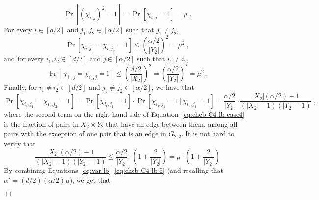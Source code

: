 \documentclass{article}
\newcommand{\Ex}{\mathbb{E}}
\newenvironment{proofof}[1]{\smallskip\noindent{\bf Proof of #1:}}%
        {\hspace*{\fill}$\Box$\par}
\newcommand{\commentt}[1]{ {}}
\begin{document}
\begin{proofof}{Claim~\ref{clm:Pr-Es}}
\begin{equation} \label{eq:cheb-C4-lb-case1}
\Pr[(\chi_{i,j})^2 = 1] = \Pr[\chi_{i,j}=1] = \mu\;.
\end{equation}
 For every $i\in [d/2]$ and $j_1,j_2 \in [\alpha/2]$ such that $j_1 \neq j_2$,
\begin{equation}\label{eq:cheb-C4-lb-case2}
\Pr[\chi_{i,j_1}=\chi_{i,j_2}=1]
  \leq \left( \frac{\alpha/2}{|Y_2|}\right)^2 = \mu^2
  \;,
\end{equation}
and for every $i_1,i_2\in [d/2]$ and $j\in [\alpha/2]$ such that $i_1\neq i_2$,
\begin{equation}\label{eq:cheb-C4-lb-case3}
 \Pr[\chi_{i_1,j}=\chi_{i_2,j}=1]
\leq %
\left( \frac{d/2}{|X_2|}\right)^2 = \left( \frac{\alpha/2}{|Y_2|}\right)^2 = \mu^2 %
\;.
\end{equation}
Finally,
for $i_1\neq i_2\in [d/2]$ and $j_1\neq j_2\in [\alpha/2]$, we have that
\begin{equation}\label{eq:cheb-C4-lb-case4}
\Pr[\chi_{i_1,j_1}=\chi_{i_2,j_2}=1]
=  \Pr[\chi_{i_1,j_1}=1] \cdot
\Pr[\chi_{i_1,j_1}=1\,|\,\chi_{i_2,j_1}=1]
  =\frac{\alpha/2}{|Y_2|}\cdot \frac{|X_2|(\alpha/2)-1}{(|X_2|-1)(|Y_2|-1)}\;,
\end{equation}
where the second term on the right-hand-side of Equation~\eqref{eq:cheb-C4-lb-case4} is the fraction of pairs in $X_2\times Y_2$ that have an edge between them, among all pairs with the exception of one pair that is an edge in $G_{2,2}$.
It is not hard to verify that
\begin{equation}\label{eq:cheb-C4-lb-5}
 \frac{|X_2|(\alpha/2)-1}{(|X_2|-1)(|Y_2|-1)} \leq \frac{\alpha/2}{|Y_2|} \cdot \left(1+\frac{2}{|Y_2|}\right) = \mu \cdot \left(1+\frac{2}{|Y_2|}\right)
\end{equation}
By combining Equations~\eqref{eq:var-lb}--\eqref{eq:cheb-C4-lb-5} (and recalling that $\alpha' = (d/2)(\alpha/2)\mu$), we get that
\begin{eqnarray}

\end{eqnarray}
\end{proofof}
\end{document}
